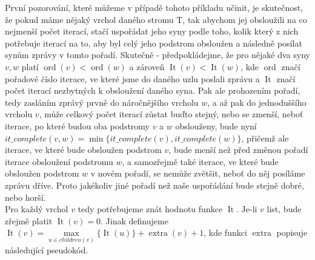 \documentclass[12pt,a4paper]{article}
\theoremstyle{plain}
\newcommand\addfunctions[1]{%
  \lstset{morekeywords=[4]{#1}}}
\newcommand{\It}{\operatorname{It}}
\begin{document}
\pagestyle{fancy}                      %
\fancyhf{}                             %
\addtolength{\topmargin}{-30 pt}                   %
\setlength{\headsep}{10 pt}                      %
\renewcommand{\headrulewidth}{1 pt}                %

\addfunctions{min_path}

První pozorování, které můžeme v případě tohoto příkladu učinit, je skutečnost, že pokud máme nějaký vrchol daného stromu T, tak abychom jej obsloužili na co nejmenší počet iterací, stačí uspořádat jeho syny podle toho, kolik který z nich potřebuje iterací na to, aby byl celý jeho podstrom obsloužen a následně posílat synům zprávy v tomto pořadí. Skutečně - předpokládejme, že pro nějaké dva syny $ v, w$  platí $ \operatorname{ord}(v) < \operatorname{ord}(w) $ a zároveň $ \It(v) < \It(w) $, kde $ \operatorname{ord} $ značí pořadové číslo iterace, ve které jsme do daného uzlu poslali zprávu a $ \It $ značí počet iterací nezbytných k obsloužení daného syna. Pak ale prohozením pořadí, tedy zasláním zprávý prvně do náročnějšího vrcholu $ w $, a až pak do jednoduššího vrcholu $ v $, může celkový počet iterací zůstat buďto stejný, nebo se zmenší, neboť iterace, po které budou oba podstromy $ v $ a $ w $ obslouženy, bude nyní $ it\_complete(v, w) = \min\{it\_complete(v), it\_complete(w) \} $, přičemž ale iterace, ve které bude obsloužen podstrom $ v $, bude menší než před změnou pořadí iterace obsloužení podstromu $ w $, a samozřejmě také iterace, ve které bude obsloužen podstrom $ w $ v novém pořadí, se nemůže zvětšit, neboť do něj posíláme zprávu dříve. Proto jakékoliv jiné pořadí než naše uspořádání bude stejně dobré, nebo horší.\\

Pro každý vrchol $ v $ tedy potřebujeme znát hodnotu funkce $ \It $. Je-li $ v $ list, bude zřejmě platit $ \It(v) = 0 $. Jinak definujeme $ \It(v) = \max\limits_{u \in children(v)}\{\It(u)\} + \operatorname{extra}(v) + 1$, kde funkci $ \operatorname{extra} $ popisuje následující pseudokód.


\end{document}
